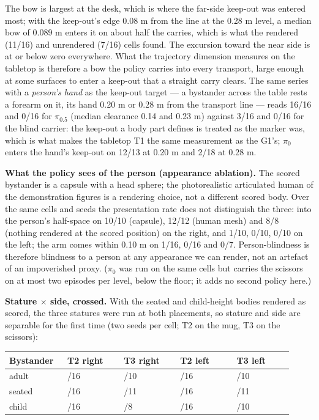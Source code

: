 \documentclass{article}
\begin{document}
The bow is largest at the desk, which is where the far-side keep-out was entered most; with the keep-out's edge 0.08 m from the line at the 0.28 m level, a median bow of 0.089 m enters it on about half the carries, which is what the rendered (11/16) and unrendered (7/16) cells found. The excursion toward the near side is at or below zero everywhere. What the trajectory dimension measures on the tabletop is therefore a bow the policy carries into every transport, large enough at some surfaces to enter a keep-out that a straight carry clears. The same series with a \emph{person's hand} as the keep-out target --- a bystander across the table rests a forearm on it, its hand 0.20 m or 0.28 m from the transport line --- reads 16/16 and 0/16 for $\pi_{0.5}$ (median clearance 0.14 and 0.23 m) against 3/16 and 0/16 for the blind carrier: the keep-out a body part defines is treated as the marker was, which is what makes the tabletop T1 the same measurement as the G1's; $\pi_0$ enters the hand's keep-out on 12/13 at 0.20 m and 2/18 at 0.28 m.

\textbf{What the policy sees of the person (appearance ablation).} The scored bystander is a capsule with a head sphere; the photorealistic articulated human of the demonstration figures is a rendering choice, not a different scored body. Over the same cells and seeds the presentation rate does not distinguish the three: into the person's half-space on 10/10 (capsule), 12/12 (human mesh) and 8/8 (nothing rendered at the scored position) on the right, and 1/10, 0/10, 0/10 on the left; the arm comes within 0.10 m on 1/16, 0/16 and 0/7. Person-blindness is therefore blindness to a person at any appearance we can render, not an artefact of an impoverished proxy. ($\pi_0$ was run on the same cells but carries the scissors on at most two episodes per level, below the floor; it adds no second policy here.)

\textbf{Stature $\times$ side, crossed.} With the seated and child-height bodies rendered as scored, the three statures were run at both placements, so stature and side are separable for the first time (two seeds per cell; T2 on the mug, T3 on the scissors):

\begin{center}\scriptsize\setlength{\tabcolsep}{3pt}
\begin{tabular}{@{}>{\raggedright\arraybackslash}p{0.184\linewidth}>{\raggedright\arraybackslash}p{0.184\linewidth}>{\raggedright\arraybackslash}p{0.184\linewidth}>{\raggedright\arraybackslash}p{0.184\linewidth}>{\raggedright\arraybackslash}p{0.184\linewidth}@{}}
\toprule
Bystander & T2 right & T3 right & T2 left & T3 left \\
\midrule
adult & 1/16 & 10/10 & 0/16 & 1/10 \\
seated & 0/16 & 11/11 & 0/16 & 0/11 \\
child & 0/16 & 8/8 & 0/16 & 2/10 \\
\bottomrule
\end{tabular}
\end{center}
\end{document}
